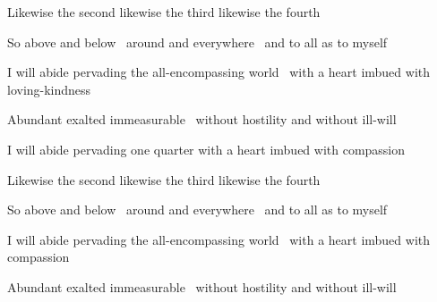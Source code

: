 \begin{english}
  Likewise the second likewise the third likewise the fourth\\
\end{english}
\begin{english-hang}
  So above and below \breathmark\ around and everywhere \breathmark\ and to all as to myself\makeatletter\hyperlink{endnote96-appendix}\makeatother\\
\end{english-hang}
\begin{english-hang}
  I will abide pervading the all-encompassing world \breathmark\ with a heart imbued with loving-kindness
\end{english-hang}
\begin{english-hang}
  Abundant exalted immeasurable \breathmark\ without hostility and without ill-will
\end{english-hang}

\medskip

\begin{english-hang}
  I will abide pervading one quarter with a heart imbued with compassion
\end{english-hang}
\begin{english}
  Likewise the second likewise the third likewise the fourth\\
\end{english}
\begin{english-hang}
  So above and below \breathmark\ around and everywhere \breathmark\ and to all as to myself
\end{english-hang}
\begin{english-hang}
  I will abide pervading the all-encompassing world \breathmark\ with a heart imbued with compassion
\end{english-hang}
\begin{english-hang}
  Abundant exalted immeasurable \breathmark\ without hostility and without ill-will
\end{english-hang}

\medskip

